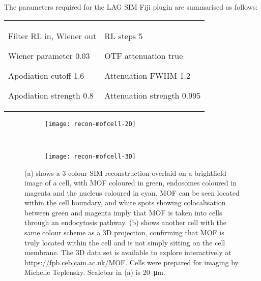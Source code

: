 The parameters required for the LAG SIM Fiji plugin are summarised as follows:
\newline
\begin{tabular}{p{}p{}}
\begin{labelling}[margin={Attenuation strength}]
	\item[Filter] RL in, Wiener out
	\item[Wiener parameter] 0.03
	\item[Apodiation cutoff] 1.6
	\item[Apodiation strength] 0.8
\end{labelling} &
\begin{labelling}[margin={Attenuation strength}]
	\item[RL steps] 5
	\item[OTF attenuation] true
	\item[Attenuation FWHM] 1.2
	\item[Attenuation strength] 0.995
\end{labelling}
\end{tabular}

\begin{figure}[tbp!]
\centering
\begin{subfigure}[b]{0.7\textwidth}
	\texttt{[image: recon-mofcell-2D]}
	\caption{}\label{fig:recon-mofcell-2D}
\end{subfigure}

~\newline
\begin{subfigure}[b]{0.7\textwidth}
	\texttt{[image: recon-mofcell-3D]}
	\caption{}\label{fig:recon-mofcell-3D}
\end{subfigure}
\caption[LAG SIM: 3D SIM reconstruction reveals that MOFs are endocytosed by HeLa cells]{(a) shows a 3-colour SIM reconstruction overlaid on a brightfield image of a cell, with MOF coloured in green, endosomes coloured in magenta and the nucleus coloured in cyan. MOF can be seen located within the cell boundary, and white spots showing colocalisation between green and magenta imply that MOF is taken into cells through an endocytosis pathway. (b) shows another cell with the same colour scheme as a 3D projection, confirming that MOF is truly located within the cell and is not simply sitting on the cell membrane. The 3D data set is available to explore interactively at \mbox{\url{https://fpb.ceb.cam.ac.uk/MOF}}. Cells were prepared for imaging by Michelle Teplensky. Scalebar in (a) is \SI{20}{\micro\metre}. }
\label{fig:recon-mofcell}
\end{figure}
\afterpage{\clearpage}

